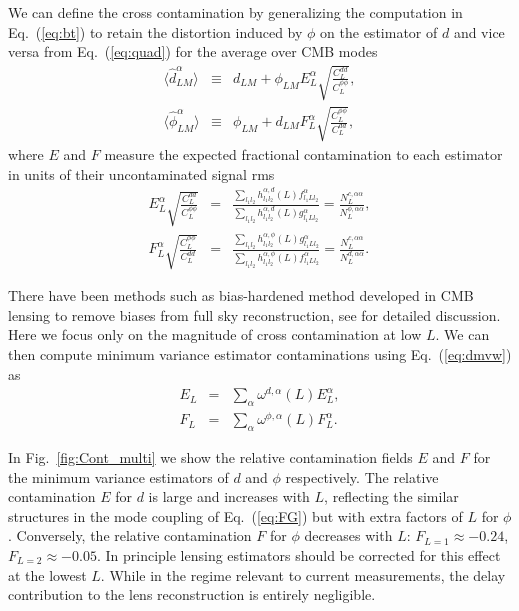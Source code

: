 \documentclass[prd,amsmath,amssymb,floatfix,superscriptaddress,nofootinbib,twocolumn]{revtex4-1}
\def\bea{\begin{eqnarray}}
\def\eea{\end{eqnarray}}
\newcommand{\ec}[1]{Eq.~(\ref{eq:#1})}
\newcommand{\rf}[1]{\ref{fig:#1}}
\newcommand{\peikai}[1]{{\color{blue} #1}}
\begin{document}
 
 
 We can define the cross contamination by generalizing the computation in \ec{bt} to retain the distortion induced by $\phi$ on the estimator of $d$ and vice
 versa from \ec{quad} for the average over CMB modes
 \bea
 \langle \hat{d}^{\alpha}_{LM} \rangle &\equiv& d_{LM} +\phi_{LM}E_{L}^{\alpha}\sqrt{\frac{C_L^{dd}}{C_L^{\phi\phi}}}, \nonumber\\
 \langle \hat{\phi}^{\alpha}_{LM} \rangle &\equiv& \phi_{LM} +d_{LM}F_{L}^{\alpha}\sqrt{\frac{C_L^{\phi\phi}}{C_L^{dd}}},
\eea
where $E$ and $F$ measure the expected fractional contamination to each estimator in units of their uncontaminated signal rms
\bea
E^{\alpha}_{L}  \sqrt{\frac{C_{L}^{dd}}{C_{L}^{\phi\phi}}}  &=&\frac{\sum_{l_{1}l_{2}}h_{l_{1}l_{2}}^{\alpha,d}(L)f_{l_{1}Ll_{2}}^{\alpha}}{\sum_{l_{1}l_{2}}h_{l_{1}l_{2}}^{\alpha,d}(L)g_{l_{1}Ll_{2}}^{\alpha}} =\frac{N_{L}^{c,\alpha\alpha}}{N_{L}^{\phi,\alpha\alpha}},\nonumber\\
F^{\alpha}_{L} \sqrt{\frac{C_{L}^{\phi\phi}}{C_{L}^{dd}}}  &=&\frac{\sum_{l_{1}l_{2}}h_{l_{1}l_{2}}^{\alpha,\phi}(L)g_{l_{1}Ll_{2}}^{\alpha}}{\sum_{l_{1}l_{2}}h_{l_{1}l_{2}}^{\alpha,\phi}(L)f_{l_{1}Ll_{2}}^{\alpha}} =\frac{N_{L}^{c,\alpha\alpha}}{N_{L}^{d,\alpha\alpha}}.
\eea

\peikai{There have been methods such as bias-hardened method developed in CMB lensing to remove biases from full sky reconstruction, see \cite{Namikawa:2014bh} for detailed discussion. Here we focus only on the magnitude of cross contamination at low $L$.} We can then compute minimum variance estimator contaminations using \ec{dmvw} as
\bea
E_{L} &=&  
\sum_{\alpha}\omega^{d,\alpha}(L)  E^{\alpha}_{L} , \nonumber\\
F_{L} &=&\sum_{\alpha}\omega^{\phi,\alpha}(L) F^{\alpha}_{L} .
\eea

 
 In Fig.~\rf{Cont_multi} we show the relative contamination fields $E$ and $F$ for the minimum 
 variance estimators of $d$ and $\phi$ respectively.   The relative contamination $E$ for
 $d$ is large and increases with $L$, reflecting the similar structures in the
 mode coupling  of \ec{FG} but with extra factors of $L$ for $\phi$. 
 Conversely, the relative contamination $F$ for $\phi$ decreases with $L$: $F_{L=1} \approx -0.24$,  $F_{L=2} \approx -0.05$.  In principle lensing estimators 
 should be corrected for this effect at the lowest $L$. 
   While in the regime relevant to current 
 measurements, the delay contribution to the lens reconstruction is entirely negligible.
 
\end{document}
